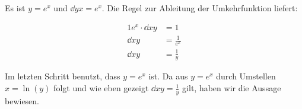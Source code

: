 \item Es ist $y=e^x$ und $\dd{y}{x} = e^x$. Die Regel zur Ableitung der Umkehrfunktion liefert:

\begin{alignat*}{1}
	e^x  \cdot \dd{x}{y} &= 1 \\
	\dd{x}{y} &= \frac{1}{e^x} \\
	\dd{x}{y} &= \frac{1}{y}
\end{alignat*}

Im letzten Schritt benutzt, dass $y=e^x$ ist. Da aus $y=e^x$ durch Umstellen $x=\ln(y)$ folgt und wie eben gezeigt $\dd{x}{y} = \frac{1}{y}$ gilt, haben wir die Aussage bewiesen.